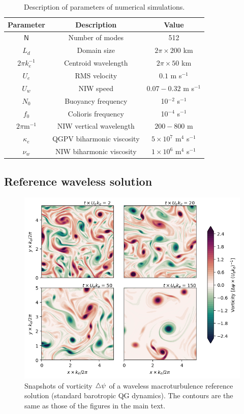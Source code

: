\documentclass{jfm}
\begin{document}
\begin{table}
 \begin{center}
   \label{parameters_description}
   \caption{Description of parameters of numerical simulations.}
   \begin{tabular}{ c | c | c }
      Parameter & Description & Value \\ \hline
      $\mathsf{N}$   & Number of modes &  512 \\
      $L_d$ & Domain size & $2\pi\times 200$ km \\
      $2\pi k_e^{-1}$ & Centroid wavelength & $2\pi\times 50$ km \\
      $U_e$ & RMS velocity & $0.1$ m s$^{-1}$ \\
      $U_w$ & NIW speed & $0.07 - 0.32$ m s$^{-1}$ \\
      $N_0$ & Buoyancy frequency & 10$^{-2}$ s$^{-1}$\\
      $f_0$ & Colioris frequency & 10$^{-4}$ s$^{-1}$\\
      $2\pi$m$^{-1}$ & NIW vertical wavelength & $200 - 800$ m \\
      $\kappa_e$ & QGPV biharmonic viscosity & $5\times 10^{7}$ m$^4$ s$^{-1}$\\
      $\nu_w$ & NIW biharmonic viscosity & $ 1 \times 10^{6}$ m$^4$ s$^{-1}$\\
   \end{tabular}
 \end{center}
\end{table}

\subsection{Reference waveless solution}

\begin{figure}
\label{figc1}
\centering
\includegraphics[width=1.\textwidth]{figs/figc1.png}
\caption{Snapshots of vorticity $\triangle\psi$ of a waveless macroturbulence reference solution
          (standard barotropic QG dynamics). The contours are the same as those of the
          figures in the main text.}
\end{figure}
\end{document}
